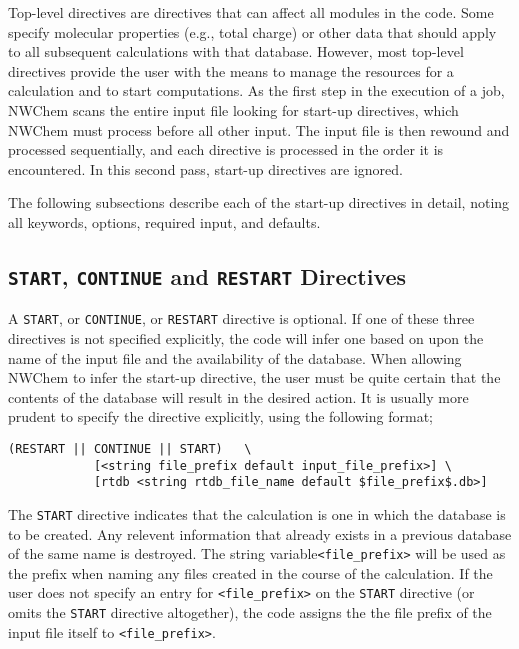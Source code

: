 \label{sec:toplevel}

Top-level directives are directives that can affect all
modules in the code.  Some specify molecular properties (e.g., total
charge) or other data that should apply to all subsequent
calculations with that database.  However, most top-level directives 
provide the user
with the means to manage the resources for a calculation and to start
computations.  As the first step in the execution of a job, NWChem
scans the entire input file looking for start-up directives, which
NWChem must process before all other input.  The input file is then
rewound and processed sequentially, and each directive is processed in
the order it is encountered.  In this second pass, start-up directives
are ignored.

The following subsections describe each of the start-up directives in detail,
noting all keywords, options, required input, and defaults.

\subsection{{\tt START}, {\tt CONTINUE} and {\tt RESTART} Directives}
\label{sec:start}

A {\tt START}, or {\tt CONTINUE}, or {\tt RESTART} directive is
optional.  If one of these three directives is not specified
explicitly, the code will infer one based on upon the name of the
input file and the availability of the database.  When allowing NWChem
to infer the start-up directive, the user must be quite certain that
the contents of the database will result in the desired action.  It
is usually more prudent to specify the directive explicitly, using the
following format;

\begin{verbatim}
(RESTART || CONTINUE || START)   \
            [<string file_prefix default input_file_prefix>] \
            [rtdb <string rtdb_file_name default $file_prefix$.db>]
\end{verbatim}

The \verb+START+ directive indicates that the calculation is one in
which the database is to be created.  Any relevent information that
already exists in a previous database of the same name is destroyed.
The string variable{\tt <file\_prefix>} will be used as the prefix when naming
any files created in the course of the calculation.  If the user does
not specify an entry for {\tt <file\_prefix>} on the \verb+START+
directive (or omits the \verb+START+ directive altogether), the code
assigns the the file prefix of the input file itself to {\tt <file\_prefix>}.  


